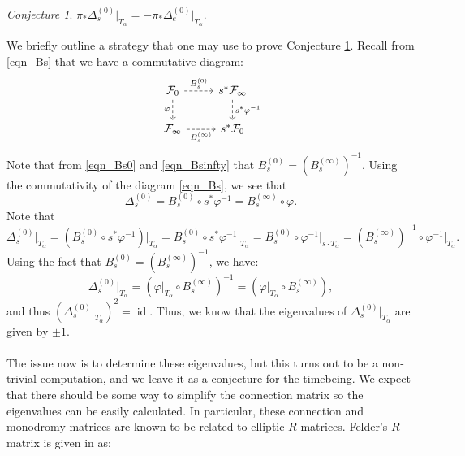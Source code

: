 \documentclass[a4paper]{report}
\theoremstyle{theorem}
\theoremstyle{definition}
\theoremstyle{remark}
\theoremstyle{proposition}
\theoremstyle{conjecture}
\newtheorem{conjecture}{Conjecture}
\theoremstyle{lemma}
\theoremstyle{corollary}
\theoremstyle{exercise}
\theoremstyle{example}
\newcommand{\on}{\operatorname}
\begin{document}
  \begin{conjecture}\label{annoying}
      $\pi_\ast\Delta_s^{(0)} \vert_{T_\alpha} = -\pi_\ast\Delta_e^{(0)}\vert_{T_\alpha}$.
  \end{conjecture}
  We briefly outline a strategy that one may use to prove Conjecture \ref{annoying}.
  Recall from \eqref{eqn_Bs} that we have a commutative diagram:
  $$\begin{tikzcd}
      \mathcal{F}_0 \arrow[d, "\varphi"', dashed] \arrow[r, "B_s^{(0)}", dashed] & s^\ast \mathcal{F}_\infty \arrow[d, "s^\ast \varphi^{-1}", dashed] \\
      \mathcal{F}_\infty \arrow[r, "B_s^{(\infty)}"', dashed]                    & s^\ast\mathcal{F}_0                                               
  \end{tikzcd}$$ 
  Note that from \eqref{eqn_Bs0} and \eqref{eqn_Bsinfty} that 
  $B_s^{(0)} = \left(B_s^{(\infty)}\right)^{-1}$.
  Using the commutativity of the diagram \eqref{eqn_Bs}, we see that 
  $$\Delta_s^{(0)} = B_s^{(0)} \circ s^\ast \varphi^{-1} = B_s^{(\infty)} \circ \varphi.$$ 
  Note that $$\Delta_s^{(0)}\vert_{T_\alpha} = \left(B_s^{(0)} \circ s^\ast\varphi^{-1}\right)\vert_{T_\alpha} = B_s^{(0)} \circ s^\ast \varphi^{-1}\vert_{T_\alpha} = B_s^{(0)} \circ \varphi^{-1}\vert_{s\cdot T_\alpha} = \left(B_s^{(\infty)}\right)^{-1} \circ \varphi^{-1}\vert_{T_\alpha}.$$
  Using the fact that $B_s^{(0)} = \left(B_s^{(\infty)}\right)^{-1}$, we have:
  $$\Delta_s^{(0)} \vert_{T_\alpha} = \left(\varphi\vert_{T_\alpha} \circ B_s^{(\infty)}\right)^{-1} = \left(\varphi\vert_{T_\alpha} \circ B_s^{(\infty)}\right),$$
  and thus $(\Delta_s^{(0)}\vert_{T_\alpha})^2 = \on{id}$.
  Thus, we know that the eigenvalues of $\Delta_s^{(0)}\vert_{T_\alpha}$ are given by $\pm 1$. \\\\
  The issue now is to determine 
  these eigenvalues, but this turns out to be a non-trivial computation, and we leave it as a conjecture for the timebeing. We expect that there should be 
  some way to simplify the connection matrix so the eigenvalues can be easily calculated. In particular, these connection and monodromy matrices 
  are known to be related to elliptic $R$-matrices. Felder's $R$-matrix is given in \cite[(85)]{ao16} as:
\end{document}
